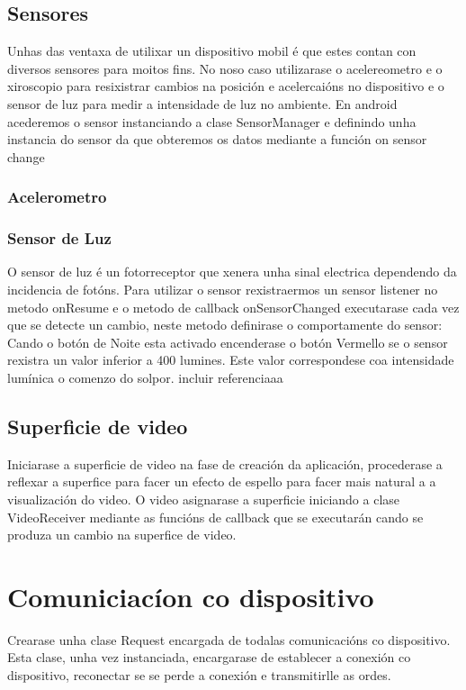 \subsection{Sensores}
Unhas das ventaxa de utilixar un dispositivo mobil é que estes contan con diversos sensores para moitos fins. No noso caso utilizarase o acelereometro e o xiroscopio para resixistrar cambios na posición e acelercaións no dispositivo e o sensor de luz para medir a intensidade de luz no ambiente.
En android acederemos o sensor instanciando a clase SensorManager e definindo unha instancia do sensor da que obteremos os datos mediante a función on sensor change
\subsubsection{Acelerometro}
\subsubsection{Sensor de Luz}
O sensor de luz é un fotorreceptor que xenera unha sinal electrica dependendo da incidencia de fotóns. Para utilizar o sensor rexistraermos un sensor listener no metodo onResume e o metodo de callback onSensorChanged executarase cada vez que se detecte un cambio, neste metodo definirase o comportamente do sensor: Cando o botón de Noite esta activado encenderase o botón Vermello se o sensor rexistra un valor inferior a 400 lumines. Este valor correspondese coa intensidade lumínica o comenzo do solpor.
incluir referenciaaa

\subsection{Superficie de video}
Iniciarase a superficie de video na fase de creación da aplicación, procederase a reflexar a superfice para facer un efecto de espello para facer mais natural a a visualización do video. O video asignarase a superficie iniciando a clase VideoReceiver mediante as funcións de callback que se executarán cando se produza un cambio na superfice de video.

\section{Comuniciacíon co dispositivo}
Crearase unha clase Request encargada de todalas comunicacións co dispositivo.  Esta clase, unha vez instanciada, encargarase de establecer a conexión co dispositivo, reconectar se se perde a conexión e transmitirlle as ordes.

